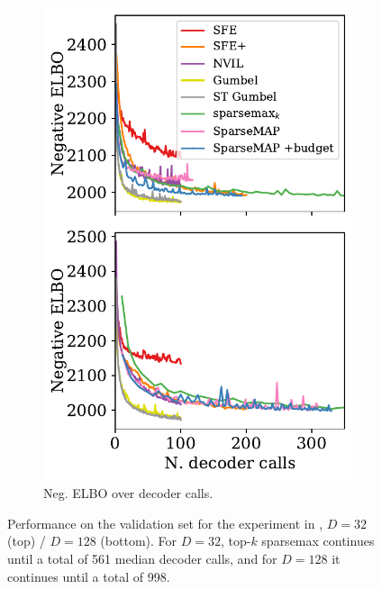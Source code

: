 \begin{figure}[ht]
\begin{subfigure}[b]{0.49\textwidth}
        \includegraphics[width=\textwidth]{Figures/elbo-calls.pdf}
        \caption{Neg. ELBO over decoder calls.}
        \label{fig:elbo_bit_calls}
    \end{subfigure}
    \caption{Performance on the validation set
        for the experiment in ,
        $D=32$ (top) / $D=128$ (bottom). For $D=32$, top-$k$ sparsemax continues
        until a total of 561 median decoder calls, and for $D=128$ it continues
        until a total of 998.}
    \label{fig:elbo_bit}
\end{figure}

